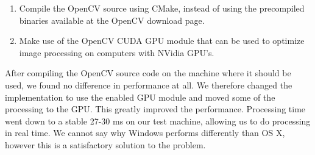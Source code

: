 \begin{enumerate}
    \item Compile the OpenCV source using CMake, instead of using the precompiled binaries available at the OpenCV download page.
    \item Make use of the OpenCV CUDA GPU module that can be used to optimize image processing on computers with NVidia GPU's.
\end{enumerate}

After compiling the OpenCV source code on the machine where it should be used, we found no difference in performance at all. We therefore changed the implementation to use the enabled GPU module and moved some of the processing to the GPU. This greatly improved the performance. Processing time went down to a stable 27-30 ms on our test machine, allowing us to do processing in real time. We cannot say why Windows performs differently than OS X, however this is a satisfactory solution to the problem.\\

